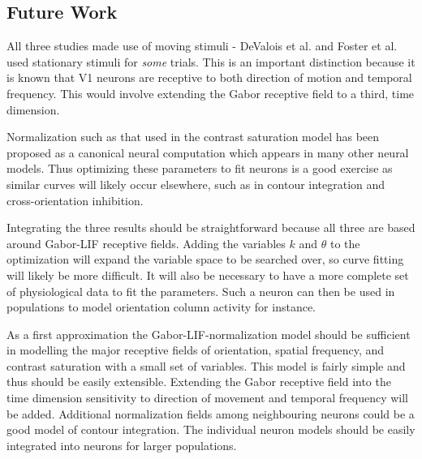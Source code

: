 \documentclass{article}
\begin{document}
\subsection{Future Work}
All three studies made use of moving stimuli - DeValois et al. and Foster et al. used stationary stimuli for \emph{some} trials. This is an important distinction because it is known that V1 neurons are receptive to both direction of motion and temporal frequency. This would involve extending the Gabor receptive field to a third, time dimension. 

Normalization such as that used in the contrast saturation model has been proposed as a canonical neural computation which appears in many other neural models. Thus optimizing these parameters to fit neurons is a good exercise as similar curves will likely occur elsewhere, such as in contour integration and cross-orientation inhibition. 

Integrating the three results should be straightforward because all three are based around Gabor-LIF receptive fields. Adding the variables $k$ and $\theta$ to the optimization will expand the variable space to be searched over, so curve fitting will likely be more difficult. It will also be necessary to have a more complete set of physiological data to fit the parameters. Such a neuron can then be used in populations to model orientation column activity for instance. 

As a first approximation the Gabor-LIF-normalization model should be sufficient in modelling the major receptive fields of orientation, spatial frequency, and contrast saturation with a small set of variables. This model is fairly simple and thus should be easily extensible. Extending the Gabor receptive field into the time dimension sensitivity to direction of movement and temporal frequency will be added. Additional normalization fields among neighbouring neurons could be a good model of contour integration. The individual neuron models should be easily integrated into neurons for larger populations. 

\printbibliography
\end{document}

